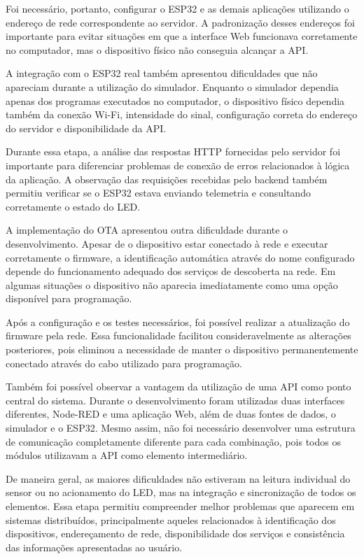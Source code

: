 Foi necessário, portanto, configurar o ESP32 e as demais aplicações utilizando o endereço de rede correspondente ao servidor. A padronização desses endereços foi importante para evitar situações em que a interface Web funcionava corretamente no computador, mas o dispositivo físico não conseguia alcançar a API.

A integração com o ESP32 real também apresentou dificuldades que não apareciam durante a utilização do simulador. Enquanto o simulador dependia apenas dos programas executados no computador, o dispositivo físico dependia também da conexão Wi-Fi, intensidade do sinal, configuração correta do endereço do servidor e disponibilidade da API.

Durante essa etapa, a análise das respostas HTTP fornecidas pelo servidor foi importante para diferenciar problemas de conexão de erros relacionados à lógica da aplicação. A observação das requisições recebidas pelo backend também permitiu verificar se o ESP32 estava enviando telemetria e consultando corretamente o estado do LED.

A implementação do OTA apresentou outra dificuldade durante o desenvolvimento. Apesar de o dispositivo estar conectado à rede e executar corretamente o firmware, a identificação automática através do nome configurado depende do funcionamento adequado dos serviços de descoberta na rede. Em algumas situações o dispositivo não aparecia imediatamente como uma opção disponível para programação.

Após a configuração e os testes necessários, foi possível realizar a atualização do firmware pela rede. Essa funcionalidade facilitou consideravelmente as alterações posteriores, pois eliminou a necessidade de manter o dispositivo permanentemente conectado através do cabo utilizado para programação.

Também foi possível observar a vantagem da utilização de uma API como ponto central do sistema. Durante o desenvolvimento foram utilizadas duas interfaces diferentes, Node-RED e uma aplicação Web, além de duas fontes de dados, o simulador e o ESP32. Mesmo assim, não foi necessário desenvolver uma estrutura de comunicação completamente diferente para cada combinação, pois todos os módulos utilizavam a API como elemento intermediário.

De maneira geral, as maiores dificuldades não estiveram na leitura individual do sensor ou no acionamento do LED, mas na integração e sincronização de todos os elementos. Essa etapa permitiu compreender melhor problemas que aparecem em sistemas distribuídos, principalmente aqueles relacionados à identificação dos dispositivos, endereçamento de rede, disponibilidade dos serviços e consistência das informações apresentadas ao usuário.


